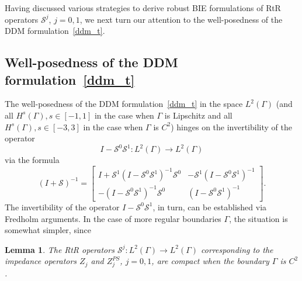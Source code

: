 \documentclass[11pt]{article}
\numberwithin{equation}{section}
\newtheorem{lemma}[theorem]{Lemma}
\begin{document}
Having discussed various strategies to derive robust BIE formulations of RtR operators $\mathcal{S}^j$, $j=0,1$, we next turn our attention to the well-posedness of the DDM formulation~\eqref{ddm_t}. 

\subsection{Well-posedness of the DDM formulation~\eqref{ddm_t}\label{DDMw}}

The well-posedness of the DDM formulation~\eqref{ddm_t} in the space $L^2(\Gamma)$ (and all $H^s(\Gamma), s\in[-1,1]$ in the case when $\Gamma$ is Lipschitz and all $H^s(\Gamma), s\in[-3,3]$ in the case when $\Gamma$ is $C^2$) hinges on the invertibility of the operator
\[
I-\mathcal{S}^0\mathcal{S}^1:L^2(\Gamma)\to L^2(\Gamma)
\]
via the formula
\begin{equation}\label{inv_matrix_explicit}
  (I+\mathcal{S})^{-1}=\begin{bmatrix}
I+\mathcal{S}^1(I-\mathcal{S}^0\mathcal{S}^1)^{-1}\mathcal{S}^0 & -\mathcal{S}^1(I-\mathcal{S}^0\mathcal{S}^1)^{-1}\\
-(I-\mathcal{S}^0\mathcal{S}^1)^{-1}\mathcal{S}^0 &
(I-\mathcal{S}^0\mathcal{S}^1)^{-1}
\end{bmatrix}.
\end{equation}
The invertibility of the operator $I-\mathcal{S}^0\mathcal{S}^1$, in turn, can be established via Fredholm arguments. In the case of more regular boundaries $\Gamma$, the situation is somewhat simpler, since 
\begin{lemma}\label{lemma1}
The RtR operators $\mathcal{S}^j:L^2(\Gamma)\to L^2(\Gamma)$ corresponding to the impedance operators $Z_j$ and $Z_j^{PS}$, $j=0,1$, are compact when the boundary $\Gamma$ is $C^2$.
\end{lemma}
\end{document}
